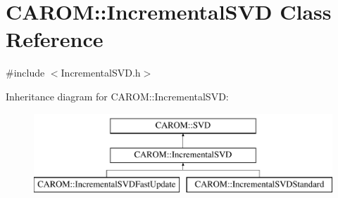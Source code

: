 \hypertarget{class_c_a_r_o_m_1_1_incremental_s_v_d}{\section{C\-A\-R\-O\-M\-:\-:Incremental\-S\-V\-D Class Reference}
\label{class_c_a_r_o_m_1_1_incremental_s_v_d}
}


{\ttfamily \#include $<$Incremental\-S\-V\-D.\-h$>$}

Inheritance diagram for C\-A\-R\-O\-M\-:\-:Incremental\-S\-V\-D\-:\begin{figure}[H]
\begin{center}
\leavevmode
\includegraphics[height=3.000000cm]{class_c_a_r_o_m_1_1_incremental_s_v_d}
\end{center}
\end{figure}
